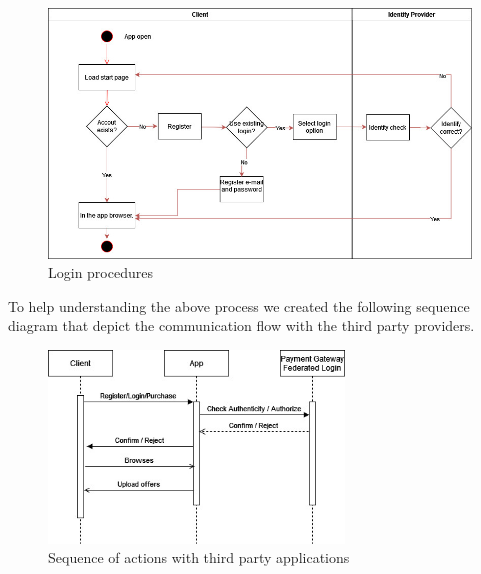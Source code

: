 \begin{figure}[H]
    \centering
    \includegraphics[width=1\textwidth]{assets/login_AC.jpg}
    \caption{Login procedures}
    \label{fig:login_register}
\end{figure}

To help understanding the above process we created the following \gls{sequence diagram} that depict the communication flow 
with the third party providers. 


\begin{figure}[H]
    \centering
    \includegraphics[width=0.7\textwidth]{assets/sequence_login_payment.jpg}
    \caption{Sequence of actions with third party applications}
    \label{fig:sequence_login_payment}
\end{figure}



